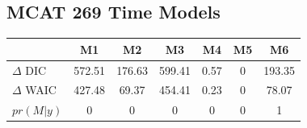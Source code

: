 \documentclass[12pt]{article}
\begin{document}
%
%
%
%	
%

\clearpage
\subsection{MCAT 269 Time Models}
	\begin{table}[h!]
	\centering
	\begin{tabular}[c]{@{}lcccccc@{}}
	\hline
	& M1 & M2 & M3 & M4 & M5 & M6 \\ \hline
	\(\Delta\) DIC & 572.51 & 176.63 & 599.41 & 0.57 & 0 & 193.35 \\
	\(\Delta\) WAIC & 427.48 & 69.37 & 454.41 & 0.23 & 0 & 78.07 \\
	\(pr(M|y)\) & 0 & 0 & 0 & 0 & 0 & 1	
	\end{tabular}
	\end{table}
	
\end{document}
